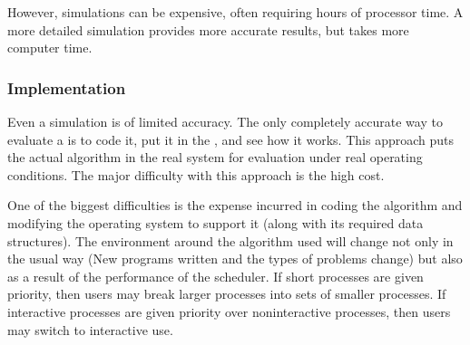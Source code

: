 However, simulations can be expensive, often requiring hours of processor time.
A more detailed simulation provides more accurate results, but takes more computer time.

\subsubsection{Implementation}\label{subsubsec:Algorithm_Implementation}
Even a simulation is of limited accuracy.
The only completely accurate way to evaluate a  is to code it, put it in the , and see how it works.
This approach puts the actual algorithm in the real system for evaluation under real operating conditions.
The major difficulty with this approach is the high cost.

One of the biggest difficulties is the expense incurred in coding the algorithm and modifying the operating system to support it (along with its required data structures).
The environment around the algorithm used will change not only in the usual way (New programs written and the types of problems change) but also as a result of the performance of the scheduler.
If short processes are given priority, then users may break larger processes into sets of smaller processes.
If interactive processes are given priority over noninteractive processes, then users may switch to interactive use.

